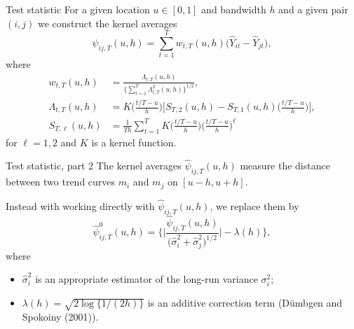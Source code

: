 \documentclass[10pt]{beamer}
\begin{document}
\begin{frame}{Test statistic}
For a given location $u \in [0,1]$ and bandwidth $h$ and a given pair $(i, j)$ we construct the kernel averages
\begin{equation*}
\widehat{\psi}_{ij, T}(u,h) = \sum\limits_{t=1}^T w_{t,T}(u,h) \big(\widehat{Y}_{it} - \widehat{Y}_{jt}), 
\end{equation*}\pause
\vspace{-3mm}
where 
\begin{align*}
w_{t,T}(u,h) &= \frac{\Lambda_{t,T}(u,h)}{ \{\sum\nolimits_{t=1}^T \Lambda_{t,T}^2(u,h)\}^{1/2} } ,\\
\Lambda_{t,T}(u,h) &= K\Big(\frac{t/T-u}{h}\Big) \Big[ S_{T,2}(u,h)  - S_{T,1}(u,h)\Big(\frac{t/T-u}{h}\Big) \Big], \\
S_{T,\ell}(u,h) &= \frac{1}{Th} \sum\nolimits_{t=1}^T K\Big(\frac{t/T-u}{h}\Big) \Big(\frac{t/T-u}{h}\Big)^\ell
\end{align*}
for $\ell = 1,2$ and $K$ is a kernel function.
\end{frame}

\begin{frame}[label = frame_teststatistic]{Test statistic, part 2}
The kernel averages $\widehat{\psi}_{ij, T}(u,h)$ measure the distance between two trend curves $m_i$ and $m_j$ on $[u - h, u + h]$. \pause

Instead with working directly with $\widehat{\psi}_{ij, T}(u,h)$, we replace them by
\begin{equation*}
\widehat{\psi}^0_{ij, T}(u,h) = \bigg\{ \bigg|\frac{\widehat{\psi}_{ij, T}(u,h)}{\big(\widehat{\sigma}_i^2 + \widehat{\sigma}_j^2\big)^{1/2}}\bigg| - \lambda(h) \bigg\}, 
\end{equation*}\pause
\vspace{-3mm}
where 
\begin{itemize}
\item $\widehat{\sigma}_i^2$ is an appropriate estimator of the long-run variance $\sigma^2_i$;
\item $\lambda(h) = \sqrt{2 \log \{ 1/(2h) \}}$ is an additive correction term (D{\"u}mbgen and Spokoiny (2001)). %
\end{itemize}
\end{frame}
\end{document}
